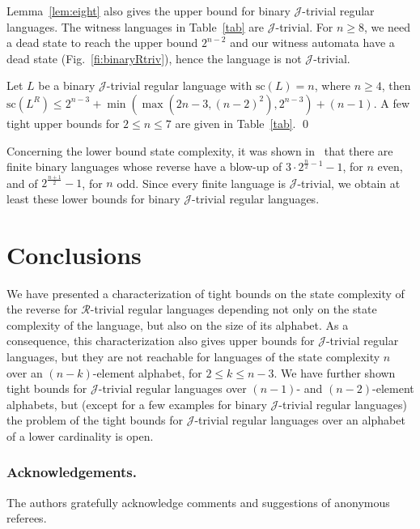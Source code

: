 \documentclass[runningheads]{llncs}
\newcommand{\R}{$\mathcal{R}$}
\newcommand{\J}{$\mathcal{J}$}
\renewcommand{\sc}{\mathrm{sc}}
\begin{document}
  Lemma~\ref{lem:eight} also gives the upper bound for binary \J-trivial regular languages. The witness languages in Table~\ref{tab} are \J-trivial. For $n\ge 8$, we need a dead state to reach the upper bound $2^{n-2}$ and our witness automata have a dead state (Fig.~\ref{fi:binaryRtriv}), hence the language is not \J-trivial.
  \begin{corollary}
    Let $L$ be a binary \J-trivial regular language with $\sc(L)=n$, 
    where $n\ge 4$, then $\sc(L^R)\le 2^{n-3} + \min(\max(2n-3,(n-2)^2),2^{n-3}) + (n-1)$. 
    A few tight upper bounds for $2\le n\le 7$ are given in Table~\ref{tab}.
    \qed
  \end{corollary}
  
  Concerning the lower bound state complexity, it was shown in~\cite{CampeanuCSY99} that there are finite binary languages whose reverse have a blow-up of $3 \cdot 2^{\frac{n}{2}-1} - 1$, for $n$ even, and of $2^{\frac{n+1}{2}} - 1$, for $n$ odd. Since every finite language is \J-trivial, we obtain at least these lower bounds for binary \J-trivial regular languages.

\section{Conclusions}\label{***conclu}
  We have presented a characterization of tight bounds on the state complexity of the reverse for \R-trivial regular languages depending not only on the state complexity of the language, but also on the size of its alphabet. As a consequence, this characterization also gives upper bounds for \J-trivial regular languages, but they are not reachable for languages of the state complexity $n$ over an $(n-k)$-element alphabet, for $2\le k\le n-3$. We have further shown tight bounds for \J-trivial regular languages over $(n-1)$- and $(n-2)$-element alphabets, but (except for a few examples for binary \J-trivial regular languages) the problem of the tight bounds for \J-trivial regular languages over an alphabet of a lower cardinality is open.

\subsubsection*{Acknowledgements.}
  The authors gratefully acknowledge comments and suggestions of anonymous referees.



\end{document}

